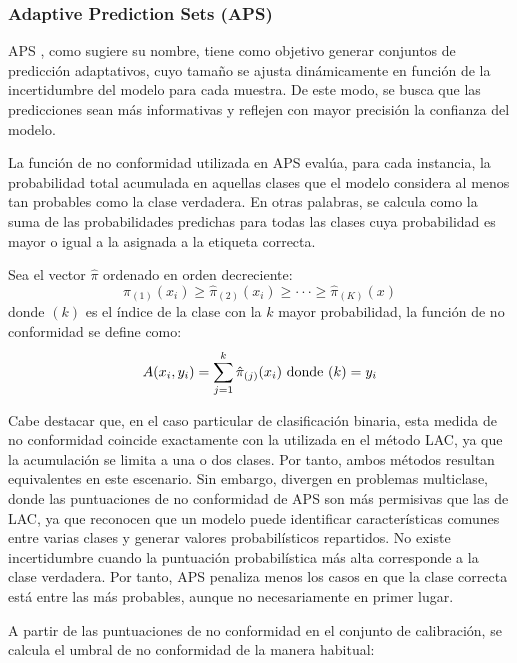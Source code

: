 
\subsubsection{Adaptive Prediction Sets (APS)}

\acrshort{APS} \cite{romano2020}, como sugiere su nombre, tiene como objetivo generar conjuntos de predicción adaptativos, cuyo tamaño se ajusta dinámicamente en función de la incertidumbre del modelo para cada muestra. De este modo, se busca que las predicciones sean más informativas y reflejen con mayor precisión la confianza del modelo.

La función de no conformidad utilizada en \acrshort{APS} evalúa, para cada instancia, la probabilidad total acumulada en aquellas clases que el modelo considera al menos tan probables como la clase verdadera. En otras palabras, se calcula como la suma de las probabilidades predichas para todas las clases cuya probabilidad es mayor o igual a la asignada a la etiqueta correcta.

Sea el vector $\hat{\pi}$ ordenado en orden decreciente: 
$$
\hat{\pi}_{(1)}(x_i) \ge \hat{\pi}_{(2)}(x_i) \ge \cdot\cdot\cdot \ge \hat{\pi}_{(K)}(x)
$$
donde $(k)$ es el índice de la clase con la $k$ mayor probabilidad, la función de no conformidad se define como:
$$
A(x_i, y_i) = \sum_{j=1}^k \hat{\pi}_{(j)}(x_i) \textnormal{ donde } (k)=y_i 
$$

Cabe destacar que, en el caso particular de clasificación binaria, esta medida de no conformidad coincide exactamente con la utilizada en el método \acrshort{LAC}, ya que la acumulación se limita a una o dos clases. Por tanto, ambos métodos resultan equivalentes en este escenario. Sin embargo, divergen en problemas multiclase, donde las puntuaciones de no conformidad de \acrshort{APS} son más permisivas que las de \acrshort{LAC}, ya que reconocen que un modelo puede identificar características comunes entre varias clases y generar valores probabilísticos repartidos. No existe incertidumbre cuando la puntuación probabilística más alta corresponde a la clase verdadera. Por tanto, \acrshort{APS} penaliza menos los casos en que la clase correcta está entre las más probables, aunque no necesariamente en primer lugar.

A partir de las puntuaciones de no conformidad en el conjunto de calibración, se calcula el umbral de no conformidad de la manera habitual:

